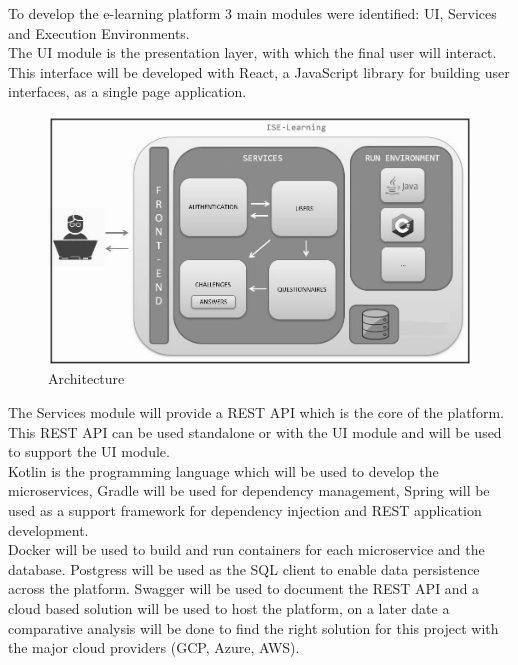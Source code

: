 To develop the e-learning platform 3 main modules were identified: UI, Services and Execution Environments.
\\
The UI module is the presentation layer, with which the final user will interact. This interface will be developed with React, a JavaScript library for building user interfaces, as a single page application.
\\
	\begin{figure}
  		\includegraphics[scale=0.6]{./imgs/arquitectura.JPG}
  		\caption{Architecture}
  		\label{fig:architecture}
	\end{figure} 
The Services module will provide a REST API which is the core of the platform.
\\
This REST API can be used standalone or with the UI module and will be used to support the UI module. 
\iffalse
\\
Kotlin is the programming language which will be used to develop the microservices, Gradle will be used for dependency management, Spring will be used as a support framework for dependency injection and REST application development.
\\
Docker will be used to build and run containers for each microservice and the database. Postgress will be used as the SQL client to enable data persistence across the platform. Swagger will be used to document the REST API and a cloud based solution will be used to host the platform, on a later date a comparative analysis will be done to find the right solution for this project with the major cloud providers (GCP, Azure, AWS).
